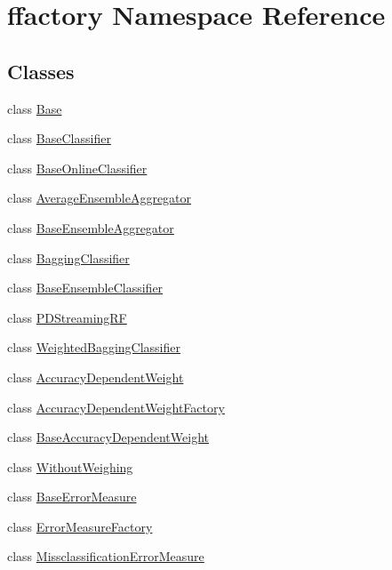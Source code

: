 \hypertarget{namespaceffactory}{\section{ffactory Namespace Reference}
\label{namespaceffactory}
}
\subsection*{Classes}
\begin{DoxyCompactItemize}
\item 
class \hyperlink{classffactory_1_1_base}{Base}
\item 
class \hyperlink{classffactory_1_1_base_classifier}{Base\-Classifier}
\item 
class \hyperlink{classffactory_1_1_base_online_classifier}{Base\-Online\-Classifier}
\item 
class \hyperlink{classffactory_1_1_average_ensemble_aggregator}{Average\-Ensemble\-Aggregator}
\item 
class \hyperlink{classffactory_1_1_base_ensemble_aggregator}{Base\-Ensemble\-Aggregator}
\item 
class \hyperlink{classffactory_1_1_bagging_classifier}{Bagging\-Classifier}
\item 
class \hyperlink{classffactory_1_1_base_ensemble_classifier}{Base\-Ensemble\-Classifier}
\item 
class \hyperlink{classffactory_1_1_p_d_streaming_r_f}{P\-D\-Streaming\-R\-F}
\item 
class \hyperlink{classffactory_1_1_weighted_bagging_classifier}{Weighted\-Bagging\-Classifier}
\item 
class \hyperlink{classffactory_1_1_accuracy_dependent_weight}{Accuracy\-Dependent\-Weight}
\item 
class \hyperlink{classffactory_1_1_accuracy_dependent_weight_factory}{Accuracy\-Dependent\-Weight\-Factory}
\item 
class \hyperlink{classffactory_1_1_base_accuracy_dependent_weight}{Base\-Accuracy\-Dependent\-Weight}
\item 
class \hyperlink{classffactory_1_1_without_weighing}{Without\-Weighing}
\item 
class \hyperlink{classffactory_1_1_base_error_measure}{Base\-Error\-Measure}
\item 
class \hyperlink{classffactory_1_1_error_measure_factory}{Error\-Measure\-Factory}
\item 
class \hyperlink{classffactory_1_1_missclassification_error_measure}{Missclassification\-Error\-Measure}

\end{DoxyCompactItemize}

